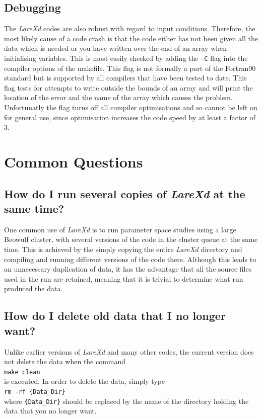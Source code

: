 \documentclass[11pt]{article}
\begin{document}
\subsection{Debugging}
The {\it LareXd} codes are also robust with regard to input conditions. Therefore, the most likely cause of a code crash is that the code either has not been given all the data which is needed or you have written over the end of an array when initialising variables. This is most easily checked by adding the \texttt{-C} flag into the compiler options of the makefile. This flag is not formally a part of the Fortran90 standard but is supported by all compilers that have been tested to date. This flag tests for attempts to write outside the bounds of an array and will print the location of the error and the name of the array which causes the problem. Unfortunatly the flag turns off all compiler optimisations and so cannot be left on for general use, since optimisation increases the code speed by at least a factor of 3.

\section{Common Questions}
\subsection*{How do I run several copies of {\it LareXd} at the same time?}
One common use of {\it LareXd} is to run parameter space studies using a large
Beowulf cluster, with several versions of the code in the cluster queue at the
same time. This is achieved by the simply copying the entire {\it
  LareXd} directory and compiling and running different versions of the code
there. Although this leads to an unnecessary duplication of data, it has the
advantage that all the source files used in the run are retained, meaning that
it is trivial to determine what run produced the data.
\subsection*{How do I delete old data that I no longer want?}
Unlike earlier versions of {\it LareXd} and many other codes, the current
version does not delete the data when the command\\
\texttt{make clean}\\
is executed. In order to delete the data, simply type\\
\texttt{rm -rf \{Data\_Dir\}}\\
where \texttt{\{Data\_Dir\}} should be replaced by the name of the directory
holding the data that you no longer want. 
\end{document}
